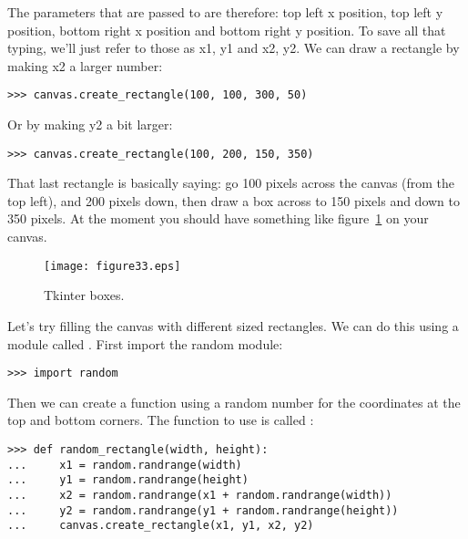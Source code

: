 The parameters that are passed to  are therefore: top left x position, top left y position, bottom right x position and bottom right y position. To save all that typing, we'll just refer to those as x1, y1 and x2, y2. We can draw a rectangle by making x2 a larger number:

\begin{listing}
\begin{verbatim}
>>> canvas.create_rectangle(100, 100, 300, 50)
\end{verbatim}
\end{listing}

\noindent
Or by making y2 a bit larger:

\begin{listing}
\begin{verbatim}
>>> canvas.create_rectangle(100, 200, 150, 350)
\end{verbatim}
\end{listing}

That last rectangle is basically saying: go 100 pixels across the canvas (from the top left), and 200 pixels down, then draw a box across to 150 pixels and down to 350 pixels. At the moment you should have something like figure~\ref{fig33} on your canvas.

\begin{figure}
\begin{center}
\texttt{[image: figure33.eps]}
\end{center}
\caption{Tkinter boxes.}\label{fig33}
\end{figure}

Let's try filling the canvas with different sized rectangles. We can do this using a module called . First import the random module:

\begin{listing}
\begin{verbatim}
>>> import random
\end{verbatim}
\end{listing}

Then we can create a function using a random number for the coordinates at the top and bottom corners.  The function to use is called :

\begin{listing}
\begin{verbatim}
>>> def random_rectangle(width, height):
...     x1 = random.randrange(width)
...     y1 = random.randrange(height)
...     x2 = random.randrange(x1 + random.randrange(width))
...     y2 = random.randrange(y1 + random.randrange(height))
...     canvas.create_rectangle(x1, y1, x2, y2)
\end{verbatim}
\end{listing}

